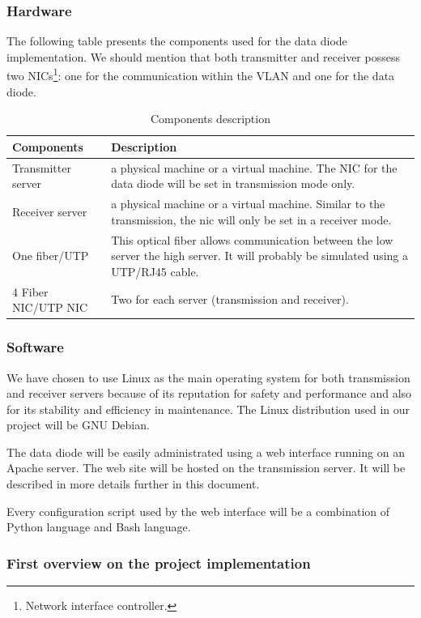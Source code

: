 \documentclass[a4paper,10pt]{article}
\begin{document}
\subsubsection{Hardware}
The following table presents the components used for the data diode implementation. We should mention that both transmitter and receiver possess two NICs\footnote{Network interface controller.}: one for the communication within the VLAN and one for the data diode.\bigskip
\begin{table}[!h]
\begin{tabular}{|p{3cm}|p{10.5cm}|}
	\hline
	\textbf{Components} & \textbf{Description}                 \\
	\hline
	Transmitter server  &  a physical machine or a virtual machine. The NIC for the data diode will be set in transmission mode only. \\
	\hline
	Receiver server  &  a physical machine or a virtual machine. Similar to the transmission, the nic will only be set in a receiver mode.\\
	\hline
	One fiber/UTP & This optical fiber allows communication between the low server the high server. It will probably be simulated using a UTP/RJ45 cable.\\
	\hline
	4 Fiber NIC/UTP NIC & Two for each server (transmission and receiver).  \\
	\hline
\end{tabular}
\caption{Components description}
\label{tab:component}
\end{table}
\subsubsection{Software}
We have chosen to use Linux as the main operating system for both transmission and receiver servers because of its reputation for safety and performance and also for its stability and efficiency in maintenance. The Linux distribution used in our project will be GNU Debian. 

The data diode will be easily administrated using a web interface running on an Apache server. The web site will be hosted on the transmission server. It will be described in more details further in this document.

Every configuration script used by the web interface will be a combination of Python language and Bash language.
\subsubsection{First overview on the project implementation}
\end{document}
